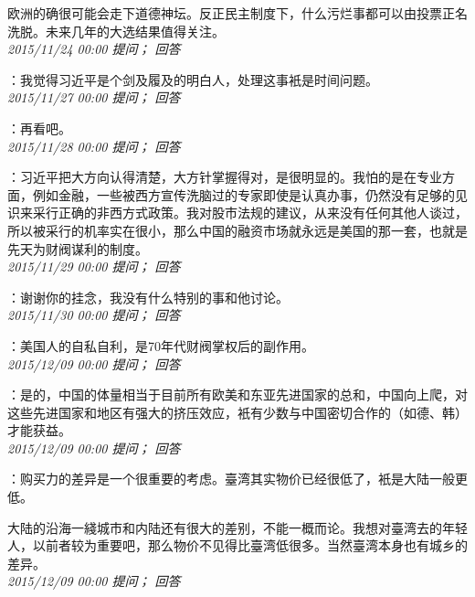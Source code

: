 \documentclass[twocolumn]{ctexart}
\begin{document}
欧洲的确很可能会走下道德神坛。反正民主制度下，什么污烂事都可以由投票正名洗脱。未来几年的大选结果值得关注。\\

\textit{\hfill\noindent\small 2015/11/24 00:00 提问； 回答}

：我觉得习近平是个剑及履及的明白人，处理这事衹是时间问题。\\

\textit{\hfill\noindent\small 2015/11/27 00:00 提问； 回答}

：再看吧。\\

\textit{\hfill\noindent\small 2015/11/28 00:00 提问； 回答}

：习近平把大方向认得清楚，大方针掌握得对，是很明显的。我怕的是在专业方面，例如金融，一些被西方宣传洗脑过的专家即使是认真办事，仍然没有足够的见识来采行正确的非西方式政策。我对股市法规的建议，从来没有任何其他人谈过，所以被采行的机率实在很小，那么中国的融资市场就永远是美国的那一套，也就是先天为财阀谋利的制度。\\

\textit{\hfill\noindent\small 2015/11/29 00:00 提问； 回答}

：谢谢你的挂念，我没有什么特别的事和他讨论。\\

\textit{\hfill\noindent\small 2015/11/30 00:00 提问； 回答}

：美国人的自私自利，是70年代财阀掌权后的副作用。\\

\textit{\hfill\noindent\small 2015/12/09 00:00 提问； 回答}

：是的，中国的体量相当于目前所有欧美和东亚先进国家的总和，中国向上爬，对这些先进国家和地区有强大的挤压效应，衹有少数与中国密切合作的（如德、韩）才能获益。\\

\textit{\hfill\noindent\small 2015/12/09 00:00 提问； 回答}

：购买力的差异是一个很重要的考虑。臺湾其实物价已经很低了，衹是大陆一般更低。

大陆的沿海一綫城市和内陆还有很大的差别，不能一概而论。我想对臺湾去的年轻人，以前者较为重要吧，那么物价不见得比臺湾低很多。当然臺湾本身也有城乡的差异。\\

\textit{\hfill\noindent\small 2015/12/09 00:00 提问； 回答}
\end{document}
